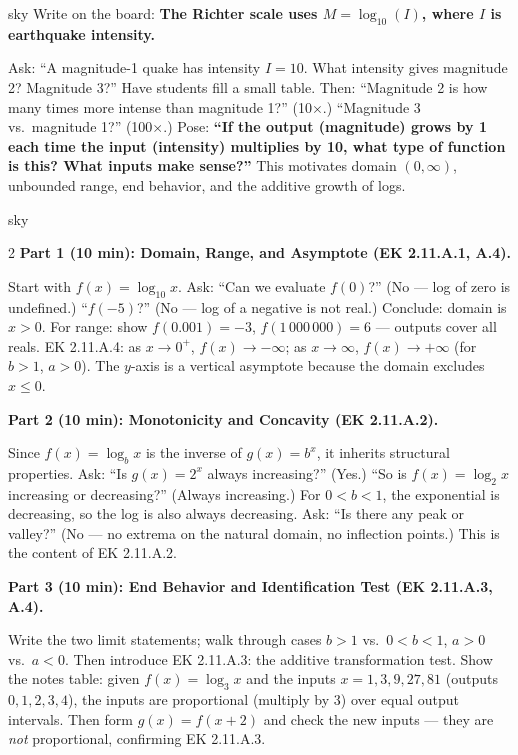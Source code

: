 \documentclass[10pt]{article}
\begin{document}
\begin{skillbox}[Hook]{sky}
    Write on the board: \textbf{The Richter scale uses $M = \log_{10}(I)$, where $I$ is
    earthquake intensity.}

    Ask: ``A magnitude-1 quake has intensity $I = 10$. What intensity gives magnitude 2?
    Magnitude 3?'' Have students fill a small table. Then: ``Magnitude 2 is how many times
    more intense than magnitude 1?'' (10$\times$.) ``Magnitude 3 vs.\ magnitude 1?'' (100$\times$.)
    Pose: \textbf{``If the output (magnitude) grows by 1 each time the input (intensity)
    multiplies by 10, what type of function is this? What inputs make sense?''} This motivates
    domain $(0,\infty)$, unbounded range, end behavior, and the additive growth of logs.
\end{skillbox}

\begin{skillbox}[Lesson]{sky}
\begin{multicols}{2}
\textbf{Part 1 (10 min): Domain, Range, and Asymptote (EK 2.11.A.1, A.4).}

Start with $f(x) = \log_{10} x$. Ask: ``Can we evaluate $f(0)$?'' (No --- log of zero is
undefined.) ``$f(-5)$?'' (No --- log of a negative is not real.) Conclude: domain is
$x > 0$. For range: show $f(0.001) = -3$, $f(1\,000\,000) = 6$ --- outputs cover all reals.
EK 2.11.A.4: as $x \to 0^+$, $f(x) \to -\infty$; as $x \to \infty$, $f(x) \to +\infty$
(for $b>1$, $a>0$). The $y$-axis is a vertical asymptote because the domain excludes
$x \le 0$.

\columnbreak

\textbf{Part 2 (10 min): Monotonicity and Concavity (EK 2.11.A.2).}

Since $f(x) = \log_b x$ is the inverse of $g(x) = b^x$, it inherits structural properties.
Ask: ``Is $g(x) = 2^x$ always increasing?'' (Yes.) ``So is $f(x) = \log_2 x$ increasing or
decreasing?'' (Always increasing.) For $0 < b < 1$, the exponential is decreasing, so the
log is also always decreasing. Ask: ``Is there any peak or valley?'' (No --- no extrema on
the natural domain, no inflection points.) This is the content of EK 2.11.A.2.

\textbf{Part 3 (10 min): End Behavior and Identification Test (EK 2.11.A.3, A.4).}

Write the two limit statements; walk through cases $b>1$ vs.\ $0<b<1$, $a>0$ vs.\ $a<0$.
Then introduce EK 2.11.A.3: the additive transformation test. Show the notes table:
given $f(x) = \log_3 x$ and the inputs $x = 1,3,9,27,81$ (outputs $0,1,2,3,4$), the
inputs are proportional (multiply by 3) over equal output intervals. Then form $g(x) = f(x+2)$
and check the new inputs --- they are \emph{not} proportional, confirming EK 2.11.A.3.
\end{multicols}
\end{skillbox}
\end{document}
